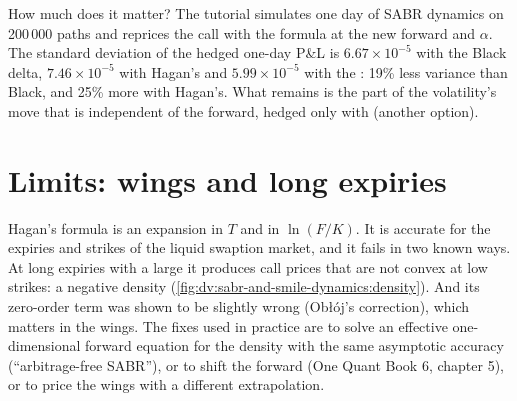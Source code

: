 \begin{omfigure}

\label{fig:dv:sabr-and-smile-dynamics:deltas}
\end{omfigure}

How much does it matter? The tutorial simulates one day of SABR dynamics on 200\,000 paths and reprices the
call with the formula at the new forward and $\alpha$. The standard deviation of the hedged one-day P\&L is
$6.67\times10^{-5}$ with the Black delta, $7.46\times10^{-5}$ with Hagan's and $5.99\times10^{-5}$ with the
: 19\% less variance than Black, and 25\% more with Hagan's. What remains is the part of the
volatility's move that is independent of the forward, hedged only with  (another option).

\section{Limits: wings and long expiries}

Hagan's formula is an expansion in $T$ and in $\ln(F/K)$. It is accurate for the expiries and strikes of the
liquid swaption market, and it fails in two known ways. At long expiries with a large 
it produces call prices that are not convex at low strikes: a negative density
(\cref{fig:dv:sabr-and-smile-dynamics:density}). And its zero-order term was shown to be slightly wrong
(Obłój's correction), which matters in the wings. The fixes used in practice are to solve an effective
one-dimensional forward equation for the density with the same asymptotic accuracy (``arbitrage-free SABR''), or
to shift the forward (One Quant Book 6, chapter 5), or to price the wings with a different extrapolation.

